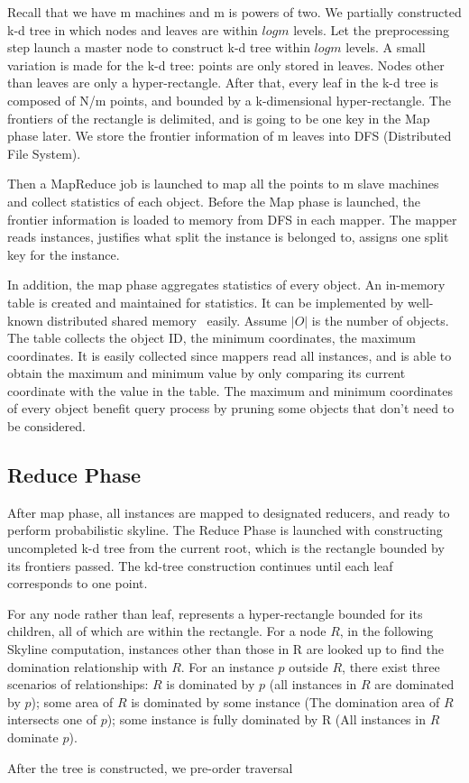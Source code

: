 Recall that we have m machines and m is powers of two. We partially constructed k-d tree in which nodes and leaves are within $log$\hspace{0.03 in}$m$ levels. Let the preprocessing step launch a master node to construct k-d tree within $log$\hspace{0.03 in}$m$ levels. A small variation is made for the k-d tree: points are only stored in leaves. Nodes other than leaves are only a hyper-rectangle. After that, every leaf in the k-d tree is composed of N/m points, and bounded by a k-dimensional hyper-rectangle. The frontiers of the rectangle is delimited, and is going to be one key in the Map phase later. We store the frontier information of m leaves into DFS (Distributed File System).


Then a MapReduce job is launched to map all the points to m slave machines and collect statistics of each object. Before the Map phase is launched, the frontier information is loaded to memory from DFS in each mapper. The mapper reads instances, justifies what split the instance is belonged to, assigns one split key for the instance.

In addition, the map phase aggregates statistics of every object. An in-memory table is created and maintained for statistics. It can be implemented by well-known distributed shared memory~\cite{DSM} easily. Assume $|O|$ is the number of objects. The table collects the object ID, the minimum coordinates, the maximum coordinates. It is easily collected since mappers read all instances, and is able to obtain the maximum and minimum value by only comparing its current coordinate with the value in the table.
The maximum and minimum coordinates of every object benefit query process by pruning some objects that don't need to be considered.

\subsection{Reduce Phase}
After map phase, all instances are mapped to designated reducers, and ready to perform probabilistic skyline. The Reduce Phase is launched with constructing uncompleted k-d tree from the current root, which is the rectangle bounded by its frontiers passed. The kd-tree construction continues until each leaf corresponds to one point.

For any node rather than leaf, represents a hyper-rectangle bounded for its children, all of which are within the rectangle. For a node $R$, in the following Skyline computation, instances other than those in R are looked up to find the domination relationship with $R$. For an instance \(p\) outside $R$, there exist three scenarios of relationships: $R$ is dominated by $p$ (all instances in $R$ are dominated by $p$); some area of $R$ is dominated by some instance (The domination area of $R$ intersects one of $p$); some instance is fully dominated by R (All instances in $R$ dominate $p$).

After the tree is constructed, we pre-order traversal
